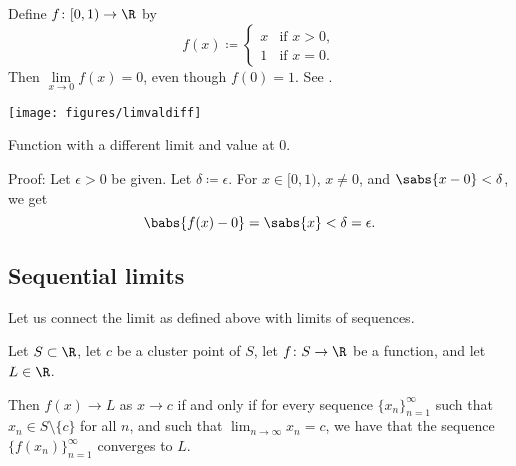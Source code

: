 \begin{example}
Define $f \colon [0,1) \to \R$ by
\begin{equation*}
f(x) \coloneqq 
\begin{cases}
x & \text{if } x > 0 , \\
1 & \text{if } x = 0 .
\end{cases}
\end{equation*}
Then
$\lim\limits_{x\to 0} f(x) = 0$,
even though $f(0) = 1$.  See .
\begin{myfigureht}
\texttt{[image: figures/limvaldiff]}
\caption{Function with a different limit and value at $0$.\label{fig:limvaldiff}}
\end{myfigureht}

Proof:  Let $\epsilon > 0$ be given.  Let $\delta \coloneqq \epsilon$.
For $x \in [0,1)$, $x \not= 0$, and $\sabs{x-0} < \delta$, we get
\begin{equation*}
\babs{f(x) - 0} = \sabs{x} < \delta = \epsilon .
\end{equation*}
\end{example}

\subsection{Sequential limits} \label{subseq:sequentiallimits}

Let us connect the limit as defined above with limits of sequences.

\begin{lemma}\label{seqflimit:lemma}
Let $S \subset \R$, let $c$ be a cluster point of $S$, let $f \colon S \to
\R$ be a function, and let $L \in \R$.

Then
$f(x) \to L$ as $x \to c$ if and only if for every sequence
$\{ x_n \}_{n=1}^\infty$
such that $x_n \in S \setminus \{c\}$ for all $n$,
and such that $\lim_{n\to\infty} x_n = c$,
we have that the sequence $\bigl\{ f(x_n) \bigr\}_{n=1}^\infty$ converges to $L$.
\end{lemma}

